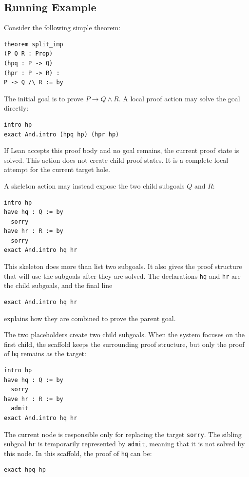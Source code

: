\documentclass[en]{uet_awesome_thesis/uet-awesome-thesis}
\begin{document}
\begin{appendices}
\chapter{Running Example}
\label{app:running-example}

Consider the following simple theorem:
\begin{verbatim}
theorem split_imp
(P Q R : Prop)
(hpq : P -> Q)
(hpr : P -> R) :
P -> Q /\ R := by
\end{verbatim}

The initial goal is to prove \(P \to Q \land R\). A local proof action may solve the goal directly:
\begin{verbatim}
intro hp
exact And.intro (hpq hp) (hpr hp)
\end{verbatim}

If Lean accepts this proof body and no goal remains, the current proof state is solved. This action does
not create child proof states. It is a complete local attempt for the current target hole.

A skeleton action may instead expose the two child subgoals \(Q\) and \(R\):
\begin{verbatim}
intro hp
have hq : Q := by
  sorry
have hr : R := by
  sorry
exact And.intro hq hr
\end{verbatim}

This skeleton does more than list two subgoals. It also gives the proof structure that will use the
subgoals after they are solved. The declarations \texttt{hq} and \texttt{hr} are the child subgoals, and
the final line
\begin{verbatim}
exact And.intro hq hr
\end{verbatim}
explains how they are combined to prove the parent goal.

The two placeholders create two child subgoals. When the system focuses on the first child, the scaffold
keeps the surrounding proof structure, but only the proof of \texttt{hq} remains as the target:
\begin{verbatim}
intro hp
have hq : Q := by
  sorry
have hr : R := by
  admit
exact And.intro hq hr
\end{verbatim}

The current node is responsible only for replacing the target \texttt{sorry}. The sibling subgoal
\texttt{hr} is temporarily represented by \texttt{admit}, meaning that it is not solved by this node. In this
scaffold, the proof of \texttt{hq} can be:
\begin{verbatim}
exact hpq hp
\end{verbatim}


\end{appendices}
\end{document}
